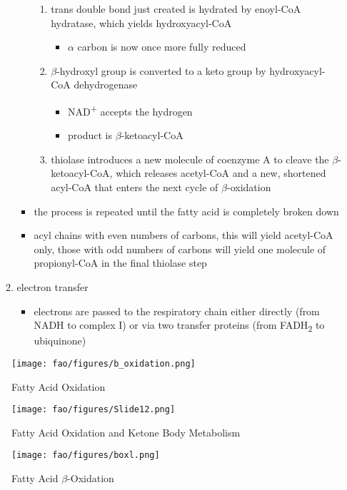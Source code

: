 \documentclass{scrartcl}
\begin{document}
\begin{itemize}
\begin{enumerate}
\begin{itemize}
\begin{enumerate}
\item trans double bond just created is hydrated by enoyl-CoA
hydratase, which yields hydroxyacyl-CoA
\begin{itemize}
\item \(\alpha\) carbon is now once more fully reduced
\end{itemize}
\item \(\beta\)-hydroxyl group is converted to a keto group by
hydroxyacyl-CoA dehydrogenase
\begin{itemize}
\item NAD\textsuperscript{+} accepts the hydrogen
\item product is \(\beta\)-ketoacyl-CoA
\end{itemize}
\item thiolase introduces a new molecule of coenzyme A to cleave
the \(\beta\)-ketoacyl-CoA, which releases acetyl-CoA and a new,
shortened acyl-CoA that enters the next cycle of
\(\beta\)-oxidation
\end{enumerate}
\item the process is repeated until the fatty acid is completely
broken down
\item acyl chains with even numbers of carbons, this will yield
acetyl-CoA only, those with odd numbers of carbons will yield
one molecule of propionyl-CoA in the final thiolase step
\end{itemize}
\item electron transfer
\begin{itemize}
\item electrons are passed to the respiratory chain either directly
(from NADH to complex I) or via two transfer proteins (from
FADH\textsubscript{2} to ubiquinone)
\end{itemize}
\end{enumerate}
\end{itemize}

\begin{figure}[htbp]
\centering
\texttt{[image: fao/figures/b\_oxidation.png]}
\caption{\label{fig:org342842b}Fatty Acid Oxidation}
\end{figure}

\begin{figure}[htbp]
\centering
\texttt{[image: fao/figures/Slide12.png]}
\caption{\label{fig:orgc25f4d5}Fatty Acid Oxidation and Ketone Body Metabolism}
\end{figure}


\begin{figure}[htbp]
\centering
\texttt{[image: fao/figures/boxl.png]}
\caption{\label{fig:orgb738806}Fatty Acid \(\beta\)-Oxidation}
\end{figure}
\end{document}
